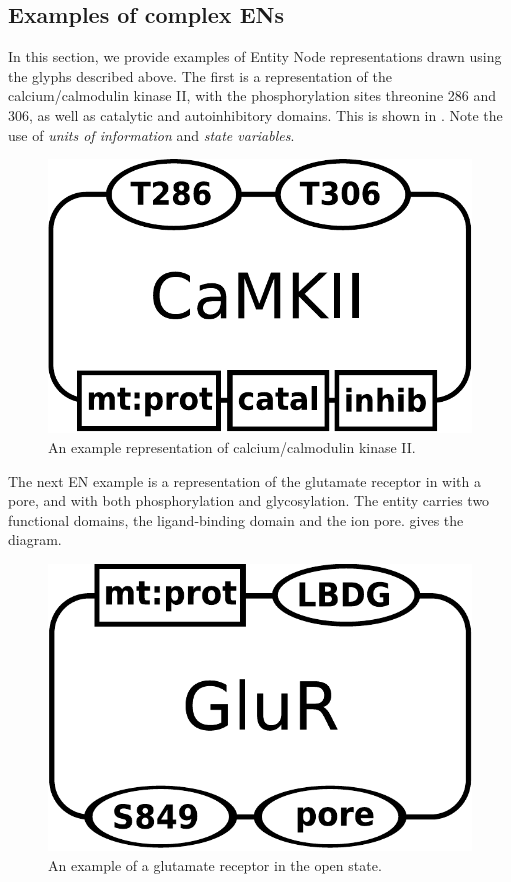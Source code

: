 
\subsection{Examples of complex ENs}
\label{sec:CplxENs}

In this section, we provide examples of Entity Node representations drawn using the \SBGNERLone glyphs described above.  The first is a representation of the calcium/calmodulin kinase II, with the phosphorylation sites threonine 286 and 306, as well as catalytic and autoinhibitory domains.  This is shown in .  Note the use of \emph{units of information} and \emph{state variables}.

\begin{figure}[H]
  \centering
  \includegraphics[scale = 0.3]{examples/macromolecule-CaMKII}
  \caption{An example representation of calcium/calmodulin kinase II.}
  \label{fig:example-camkii}
\end{figure}

The next EN example is a representation of the glutamate receptor in with a pore, and with both phosphorylation and glycosylation.  The entity carries two functional domains, the ligand-binding domain and the ion pore.   gives the diagram.

\begin{figure}[H]
  \centering
  \includegraphics[scale = 0.3]{examples/macromolecule-GluR}
  \caption{An example of a glutamate receptor in the open state.}
  \label{fig:example-glur}
\end{figure}




